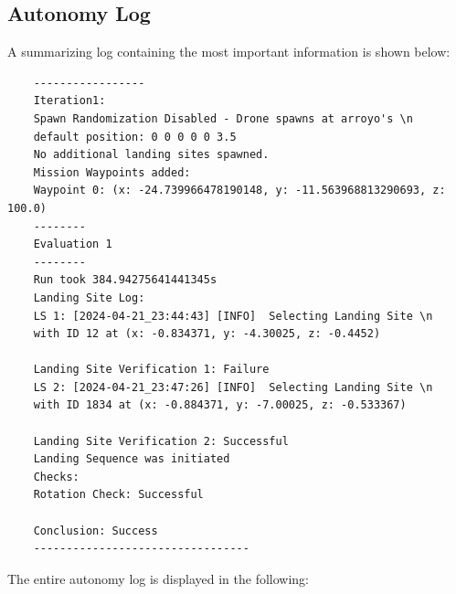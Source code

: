 \subsection{Autonomy Log}

A summarizing log containing the most important information is shown below:

\begin{lstlisting}
    -----------------
    Iteration1:
    Spawn Randomization Disabled - Drone spawns at arroyo's \n
    default position: 0 0 0 0 0 3.5
    No additional landing sites spawned.
    Mission Waypoints added:
    Waypoint 0: (x: -24.739966478190148, y: -11.563968813290693, z: 100.0)
    --------
    Evaluation 1
    --------
    Run took 384.94275641441345s
    Landing Site Log:
    LS 1: [2024-04-21_23:44:43] [INFO]  Selecting Landing Site \n
    with ID 12 at (x: -0.834371, y: -4.30025, z: -0.4452)

    Landing Site Verification 1: Failure
    LS 2: [2024-04-21_23:47:26] [INFO]  Selecting Landing Site \n
    with ID 1834 at (x: -0.884371, y: -7.00025, z: -0.533367)

    Landing Site Verification 2: Successful
    Landing Sequence was initiated
    Checks:
    Rotation Check: Successful

    Conclusion: Success
    ---------------------------------
\end{lstlisting}

The entire autonomy log is displayed in the following:

